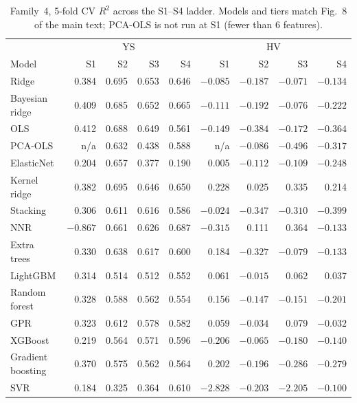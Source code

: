 \documentclass[a4paper,11pt]{article}
\begin{document}
\begin{table}[H]
\centering
\caption{Family~4, 5-fold CV $R^2$ across the S1--S4 ladder. Models and tiers match Fig.~8 of the main text; PCA-OLS is not run at S1 (fewer than 6 features).}
\label{tab:f4_5fold}
\small
\begin{tabular}{@{}lrrrr|rrrr@{}}
\toprule
& \multicolumn{4}{c|}{YS} & \multicolumn{4}{c}{HV} \\
Model & S1 & S2 & S3 & S4 & S1 & S2 & S3 & S4 \\
\midrule
Ridge            & 0.384  & 0.695 & 0.653 & 0.646 & $-0.085$ & $-0.187$ & $-0.071$ & $-0.134$ \\
Bayesian ridge   & 0.409  & 0.685 & 0.652 & 0.665 & $-0.111$ & $-0.192$ & $-0.076$ & $-0.222$ \\
OLS              & 0.412  & 0.688 & 0.649 & 0.561 & $-0.149$ & $-0.384$ & $-0.172$ & $-0.364$ \\
PCA-OLS          & n/a    & 0.632 & 0.438 & 0.588 & n/a      & $-0.086$ & $-0.496$ & $-0.317$ \\
ElasticNet       & 0.204  & 0.657 & 0.377 & 0.190 & 0.005    & $-0.112$ & $-0.109$ & $-0.248$ \\
Kernel ridge     & 0.382  & 0.695 & 0.646 & 0.650 & 0.228    & 0.025    & 0.335    & 0.214 \\
Stacking         & 0.306  & 0.611 & 0.616 & 0.586 & $-0.024$ & $-0.347$ & $-0.310$ & $-0.399$ \\
NNR              & $-0.867$ & 0.661 & 0.626 & 0.687 & $-0.315$ & 0.111 & 0.364 & $-0.133$ \\
Extra trees      & 0.330  & 0.638 & 0.617 & 0.600 & 0.184    & $-0.327$ & $-0.079$ & $-0.133$ \\
LightGBM         & 0.314  & 0.514 & 0.512 & 0.552 & 0.061    & $-0.015$ & 0.062    & 0.037 \\
Random forest    & 0.328  & 0.588 & 0.562 & 0.554 & 0.156    & $-0.147$ & $-0.151$ & $-0.201$ \\
GPR              & 0.323  & 0.612 & 0.578 & 0.582 & 0.059    & $-0.034$ & 0.079    & $-0.032$ \\
XGBoost          & 0.219  & 0.564 & 0.571 & 0.596 & $-0.206$ & $-0.065$ & $-0.180$ & $-0.140$ \\
Gradient boosting& 0.370  & 0.575 & 0.562 & 0.564 & 0.202    & $-0.196$ & $-0.286$ & $-0.279$ \\
SVR              & 0.184  & 0.325 & 0.364 & 0.610 & $-2.828$ & $-0.203$ & $-2.205$ & $-0.100$ \\
\bottomrule
\end{tabular}
\end{table}
\end{document}
